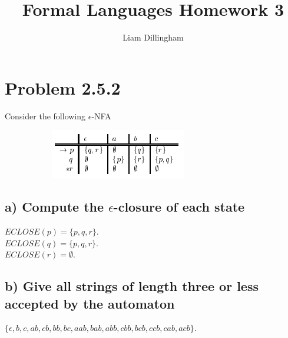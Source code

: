 \documentclass[20pt]{article} %
\title{Formal Languages Homework 3}
\author{Liam Dillingham}
\begin{document}
\maketitle

\section{Problem 2.5.2}
Consider the following $\epsilon$-NFA
\begin{figure}[!htbp]
  	\centering
   	\begin{subfigure}[p]{0.4\linewidth}
    	\includegraphics[width=\linewidth]{./figures/HW3fig1.png}
   	\end{subfigure}
\end{figure} 


\subsection{a) Compute the $\epsilon$-closure of each state}
$ECLOSE(p) = \{p, q, r\}$. \\
$ECLOSE(q) = \{p, q, r\}$. \\
$ECLOSE(r) = \emptyset$.

\subsection{b) Give all strings of length three or less accepted by the automaton}
$\{ \epsilon, b, c, ab, cb, bb, bc, aab, bab, abb, cbb, bcb, ccb, cab, acb \}$.
\end{document}
